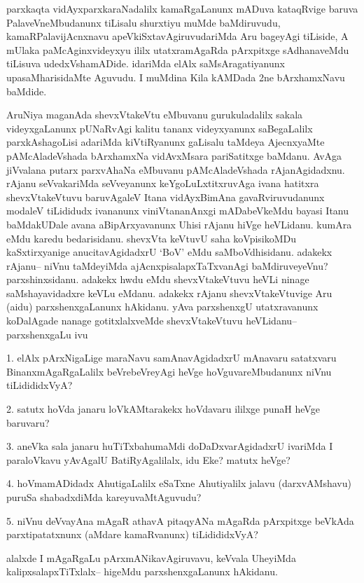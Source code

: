 \begin{artha}
parxkaqta vidAyxparxkaraNadalilx kamaRgaLanunx mADuva kataqRvige baruva PalaveVneMbudanunx tiLisalu shurxtiyu muMde baMdiruvudu, kamaRPalavijAcnxnavu apeVkiSxtavAgiruvudariMda Aru bageyAgi tiLiside, A mUlaka paMcAginxvideyxyu ililx utatxramAgaRda pArxpitxge sAdhanaveMdu tiLisuva udedxVshamADide. idariMda elAlx saMsAragatiyanunx upasaMharisidaMte Aguvudu. I muMdina Kila kAMDada 2ne bArxhamxNavu baMdide.
\end{artha}

\begin{artha}
AruNiya maganAda shevxVtakeVtu eMbuvanu gurukuladalilx sakala videyxgaLanunx pUNaRvAgi kalitu tananx videyxyanunx saBegaLalilx  parxkAshagoLisi adariMda kiVtiRyanunx gaLisalu taMdeya AjecnxyaMte pAMcAladeVshada bArxhamxNa vidAvxMsara pariSatitxge baMdanu. AvAga jiVvalana putarx parxvAhaNa eMbuvanu pAMcAladeVshada rAjanAgidadxnu. rAjanu seVvakariMda seVveyanunx keYgoLuLxtitxruvAga ivana hatitxra shevxVtakeVtuvu baruvAgaleV Itana vidAyxBimAna gavaRviruvudanunx modaleV tiLididudx ivananunx viniVtananAnxgi mADabeVkeMdu  bayasi Itanu baMdakUDale avana aBipArxyavanunx Uhisi rAjanu hiVge heVLidanu. kumAra eMdu karedu bedarisidanu. shevxVta keVtuvU saha koVpisikoMDu kaSxtirxyanige anucitavAgidadxrU `BoV' eMdu saMboVdhisidanu. adakekx rAjanu-- niVnu taMdeyiMda ajAcnxpisalapxTaTxvanAgi baMdiruveyeVnu? parxshinxsidanu. adakekx hwdu eMdu shevxVtakeVtuvu heVLi ninage saMshayavidadxre keVLu eMdanu. adakekx rAjanu shevxVtakeVtuvige Aru (aidu) parxshenxgaLanunx hAkidanu. yAva parxshenxgU utatxravanunx koDalAgade nanage gotitxlalxveMde shevxVtakeVtuvu heVLidanu-- parxshenxgaLu ivu

1. elAlx pArxNigaLige maraNavu samAnavAgidadxrU mAnavaru satatxvaru BinanxmAgaRgaLalilx beVrebeVreyAgi heVge hoVguvareMbudanunx niVnu tiLidididxVyA?

2. satutx hoVda janaru loVkAMtarakekx hoVdavaru ililxge punaH heVge baruvaru?

3. aneVka sala janaru huTiTxbahumaMdi doDaDxvarAgidadxrU ivariMda I paraloVkavu yAvAgalU BatiRyAgalilalx, idu Eke? matutx heVge?

4. hoVmamADidadx AhutigaLalilx eSaTxne Ahutiyalilx jalavu (darxvAMshavu) puruSa shabadxdiMda kareyuvaMtAguvudu?

5. niVnu deVvayAna mAgaR athavA pitaqyANa mAgaRda pArxpitxge beVkAda parxtipatatxnunx (aMdare kamaRvanunx) tiLidididxVyA?

alalxde I mAgaRgaLu pArxmANikavAgiruvavu, keVvala UheyiMda kalipxsalapxTiTxlalx-- higeMdu parxshenxgaLanunx hAkidanu. 
\end{artha}

